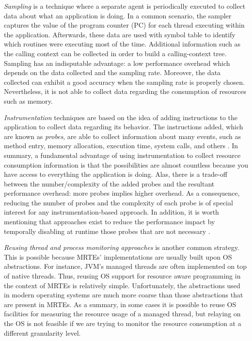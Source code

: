 \textit{Sampling} is a technique where a separate agent is periodically executed to collect data about what an application is doing.
In a common scenario, the sampler captures the value of the program counter (PC) for each thread executing within the application.
Afterwards, these data are used with symbol table to identify which routines were executing most of the time.
Additional information such as the calling context can be collected in order to build a calling-context tree.
Sampling has an indisputable advantage: a low performance overhead which depends on the data collected and the sampling rate.
Moreover, the data collected can exhibit a good accuracy when the sampling rate is properly chosen.  
Nevertheless, it is not able to collect data regarding the consumption of resources such as memory.

\textit{Instrumentation} techniques are based on the idea of adding instructions to the application to collect data regarding its behavior.
The instructions added, which are known as \textit{probes}, are able to collect information about many events, such as method entry, memory allocation, execution time, system calls, and others \cite{Ayers:2005:TFF:1064978.1065035,Sarimbekov201161,Ansaloni:2010:RDE:1712605.1712616}.
In summary, a fundamental advantage of using instrumentation to collect resource consumption information is that the possibilities are almost countless because you have access to everything the application is doing.
Alas, there is a trade-off between the number/complexity of the added probes and the resultant performance overhead: more probes implies higher overhead.
As a consequence, reducing the number of probes and the complexity of each probe is of special interest for any instrumentation-based approach.
In addition, it is worth mentioning that approaches exist to reduce the performance impact by temporally disabling at runtime those probes that are not necessary \cite{Dmitriev:2004:PJA:974043.974067,citeulike:481405,Gregg:2011:DDT:1971960}.   

\textit{Reusing thread and process monitoring approaches} is another common strategy.
This is possible because MRTEs' implementations are usually built upon OS abstractions.
For instance, JVM's managed threads are often implemented on top of native threads.
Thus, reusing OS support for resource aware programming in the context of MRTEs is relatively simple. 
Unfortunately, the abstractions used in modern operating systems are much more coarse than those abstractions that are present in MRTEs.
As a summary, in some cases it is possible to reuse OS facilities for measuring the resource usage of a managed thread, but relaying on the OS is not feasible if we are trying to monitor the resource consumption at a different granularity level.


